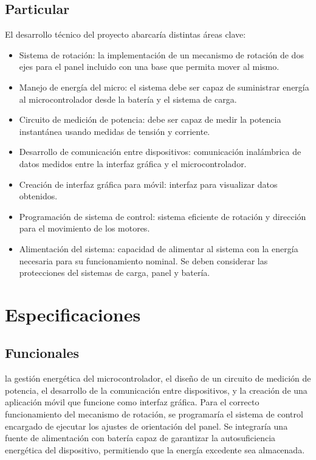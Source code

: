 \documentclass[a4paper,12pt]{article}
\begin{document}
\subsection{Particular}
El desarrollo técnico del proyecto abarcaría distintas áreas clave:
\begin{itemize}
        \item Sistema de rotación: la implementación de un mecanismo de rotación de dos ejes para el panel incluido con una base que permita mover al mismo.
        \item Manejo de energía del micro: el sistema debe ser capaz de suministrar energía al microcontrolador desde la batería y el sistema de carga.
        \item Circuito de medición de potencia: debe ser capaz de medir la potencia instantánea usando medidas de tensión y corriente.
        \item Desarrollo de comunicación entre dispositivos: comunicación inalámbrica de datos medidos entre la interfaz gráfica y el microcontrolador.
        \item Creación de interfaz gráfica para móvil: interfaz para visualizar datos obtenidos.
        \item Programación de sistema de control: sistema eficiente de rotación y dirección para el movimiento de los motores.
        \item Alimentación del sistema: capacidad de alimentar al sistema con la energía necesaria para su funcionamiento nominal. Se deben considerar las protecciones del sistemas de carga, panel y batería.
\end{itemize}

\section{Especificaciones}
\subsection{Funcionales}
  la gestión energética del microcontrolador, el diseño de un circuito de medición de potencia, el desarrollo de la comunicación entre dispositivos, y la creación de una aplicación móvil que funcione como interfaz gráfica. Para el correcto funcionamiento del mecanismo de rotación, se programaría el sistema de control encargado de ejecutar los ajustes de orientación del panel. Se integraría una fuente de alimentación con batería capaz de garantizar la autosuficiencia energética del dispositivo, permitiendo que la energía excedente sea almacenada.
\end{document}
